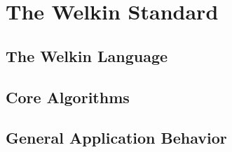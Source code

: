 \chapter{The Welkin Standard}

\section{The Welkin Language}

\section{Core Algorithms}

\section{General Application Behavior}

\label{ch:spec}

